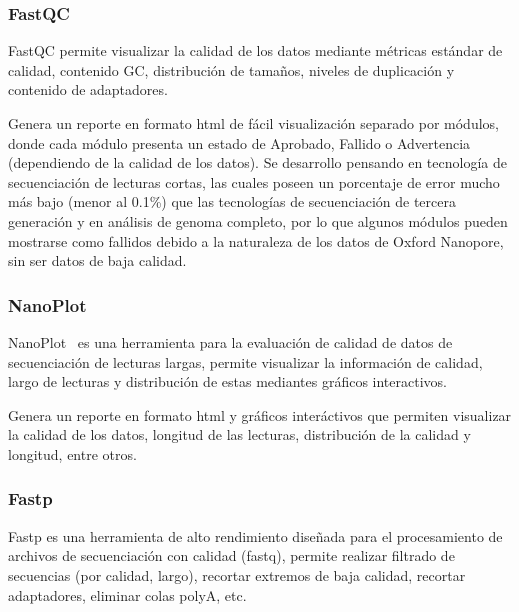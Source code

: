 \subsubsection{FastQC}
FastQC\cite{andrews2010fastqc} permite visualizar la calidad de los datos mediante métricas estándar de calidad, contenido GC, distribución de tamaños, niveles de duplicación  y contenido de adaptadores.


Genera un reporte en formato html de fácil visualización separado por módulos, donde cada módulo presenta un estado de Aprobado, Fallido o Advertencia (dependiendo de la calidad de los datos). Se desarrollo pensando en tecnología de secuenciación de lecturas cortas, las cuales poseen un porcentaje de error mucho más bajo (menor al 0.1\%) que las tecnologías de secuenciación de tercera generación y en análisis de genoma completo, por lo que algunos módulos pueden mostrarse como fallidos debido a la naturaleza de los datos de Oxford Nanopore, sin ser datos de baja calidad.
\subsubsection{NanoPlot}
NanoPlot~\cite{10.1093/bioinformatics/btad311} es una herramienta para la evaluación de calidad de datos de secuenciación de lecturas largas, permite visualizar la información de calidad, largo de lecturas y distribución de estas mediantes gráficos interactivos.

Genera un reporte en formato html y gráficos interáctivos que permiten visualizar la calidad de los datos, longitud de las lecturas, distribución de la calidad y longitud, entre otros.
\subsubsection{Fastp}

Fastp\cite{chen2018fastp} es una herramienta de alto rendimiento diseñada para el procesamiento de archivos de secuenciación con calidad (fastq), permite realizar filtrado de secuencias (por calidad, largo), recortar extremos de baja calidad, recortar adaptadores, eliminar colas polyA, etc.
